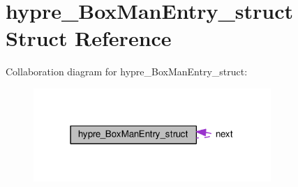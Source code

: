 \hypertarget{structhypre__BoxManEntry__struct}{}\section{hypre\+\_\+\+Box\+Man\+Entry\+\_\+struct Struct Reference}
\label{structhypre__BoxManEntry__struct}


Collaboration diagram for hypre\+\_\+\+Box\+Man\+Entry\+\_\+struct\+:
\nopagebreak
\begin{figure}[H]
\begin{center}
\leavevmode
\includegraphics[width=255pt]{structhypre__BoxManEntry__struct__coll__graph}
\end{center}
\end{figure}
